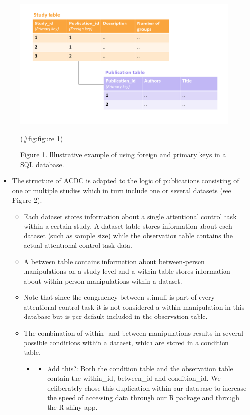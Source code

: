 \documentclass[
  man]{apa6}
\providecommand{\tightlist}{%
  \setlength{\itemsep}{0pt}\setlength{\parskip}{0pt}}
\begin{document}
\begin{figure}
\includegraphics[width=4.95in]{images/illustrate_SQL_keys} \caption{Figure 1. Illustrative example of using foreign and primary keys in a SQL database.}(\#fig:figure 1)
\end{figure}

\begin{itemize}
\tightlist
\item
  The structure of ACDC is adapted to the logic of publications consisting of one or multiple studies which in turn include one or several datasets (see Figure 2).

  \begin{itemize}
  \tightlist
  \item
    Each dataset stores information about a single attentional control task within a certain study. A dataset table stores information about each dataset (such as sample size) while the observation table contains the actual attentional control task data.
  \item
    A between table contains information about between-person manipulations on a study level and a within table stores information about within-person manipulations within a dataset.
  \item
    Note that since the congruency between stimuli is part of every attentional control task it is not considered a within-manipulation in this database but is per default included in the observation table.
  \item
    The combination of within- and between-manipulations results in several possible conditions within a dataset, which are stored in a condition table.

    \begin{itemize}
    \item
      \begin{itemize}
      \tightlist
      \item
        Add this?: Both the condition table and the observation table contain the within\_id, between\_id and condition\_id. We deliberately chose this duplication within our database to increase the speed of accessing data through our R package and through the R shiny app.
      \end{itemize}
    \end{itemize}
  \end{itemize}
\end{itemize}
\end{document}

